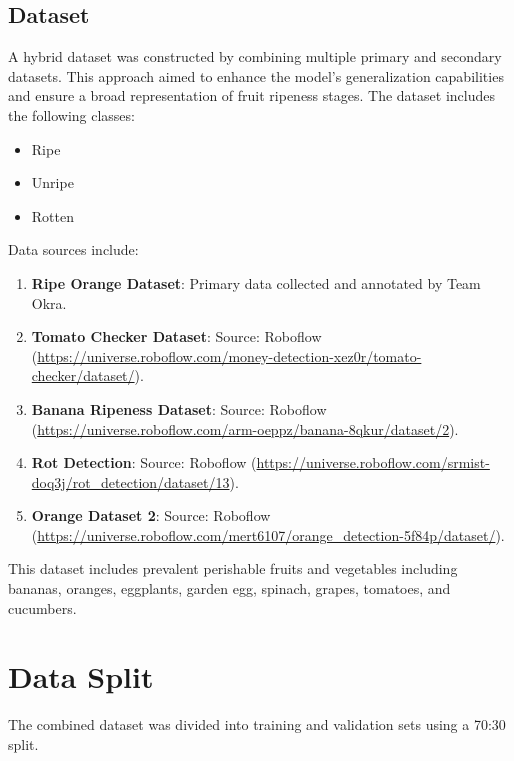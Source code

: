 {%

\subsection{Dataset}
A hybrid dataset was constructed by combining multiple primary and secondary datasets. This approach aimed to enhance the model's generalization capabilities and ensure a broad representation of fruit ripeness stages. The dataset includes the following classes:

\begin{itemize}
  \item Ripe
  \item Unripe
  \item Rotten
\end{itemize}


Data sources include:

\begin{enumerate}
  \item \textbf{Ripe Orange Dataset}: Primary data collected and annotated by Team Okra.
  \item \textbf{Tomato Checker Dataset}: Source: Roboflow (\url{https://universe.roboflow.com/money-detection-xez0r/tomato-checker/dataset/}).
  \item \textbf{Banana Ripeness Dataset}: Source: Roboflow (\url{https://universe.roboflow.com/arm-oeppz/banana-8qkur/dataset/2}).
  \item \textbf{Rot Detection}: Source: Roboflow (\url{https://universe.roboflow.com/srmist-doq3j/rot_detection/dataset/13}).
  \item \textbf{Orange Dataset 2}: Source: Roboflow (\url{https://universe.roboflow.com/mert6107/orange_detection-5f84p/dataset/}).
\end{enumerate}


This dataset includes prevalent perishable fruits and vegetables including bananas, oranges, eggplants, garden egg, spinach, grapes, tomatoes, and cucumbers.

\section{Data Split}
The combined dataset was divided into training and validation sets using a 70:30 split.

}
